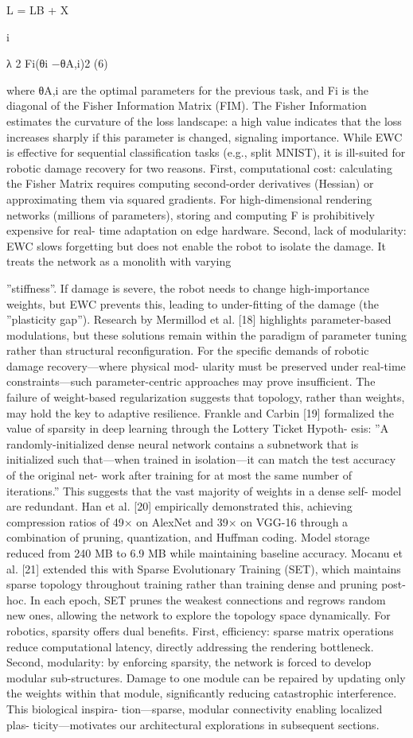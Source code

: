 \documentclass[10pt,twocolumn,letterpaper]{article}
\begin{document}
L = LB + X

i

λ 2 Fi(θi −θA,i)2 (6)

where θA,i are the optimal parameters for the previous task, and Fi is the diagonal of the Fisher Information Matrix (FIM). The Fisher Information estimates the curvature of the loss landscape: a high value indicates that the loss increases sharply if this parameter is changed, signaling importance. While EWC is effective for sequential classification tasks (e.g., split MNIST), it is ill-suited for robotic damage recovery for two reasons. First, computational cost: calculating the Fisher Matrix requires computing second-order derivatives (Hessian) or approximating them via squared gradients. For high-dimensional rendering networks (millions of parameters), storing and computing F is prohibitively expensive for real- time adaptation on edge hardware. Second, lack of modularity: EWC slows forgetting but does not enable the robot to isolate the damage. It treats the network as a monolith with varying

”stiffness”. If damage is severe, the robot needs to change high-importance weights, but EWC prevents this, leading to under-fitting of the damage (the ”plasticity gap”). Research by Mermillod et al. [18] highlights parameter-based modulations, but these solutions remain within the paradigm of parameter tuning rather than structural reconfiguration. For the specific demands of robotic damage recovery—where physical mod- ularity must be preserved under real-time constraints—such parameter-centric approaches may prove insufficient. The failure of weight-based regularization suggests that topology, rather than weights, may hold the key to adaptive resilience. Frankle and Carbin [19] formalized the value of sparsity in deep learning through the Lottery Ticket Hypoth- esis: ”A randomly-initialized dense neural network contains a subnetwork that is initialized such that—when trained in isolation—it can match the test accuracy of the original net- work after training for at most the same number of iterations.” This suggests that the vast majority of weights in a dense self- model are redundant. Han et al. [20] empirically demonstrated this, achieving compression ratios of 49× on AlexNet and 39× on VGG-16 through a combination of pruning, quantization, and Huffman coding. Model storage reduced from 240 MB to 6.9 MB while maintaining baseline accuracy. Mocanu et al. [21] extended this with Sparse Evolutionary Training (SET), which maintains sparse topology throughout training rather than training dense and pruning post-hoc. In each epoch, SET prunes the weakest connections and regrows random new ones, allowing the network to explore the topology space dynamically. For robotics, sparsity offers dual benefits. First, efficiency: sparse matrix operations reduce computational latency, directly addressing the rendering bottleneck. Second, modularity: by enforcing sparsity, the network is forced to develop modular sub-structures. Damage to one module can be repaired by updating only the weights within that module, significantly reducing catastrophic interference. This biological inspira- tion—sparse, modular connectivity enabling localized plas- ticity—motivates our architectural explorations in subsequent sections.
\end{document}
